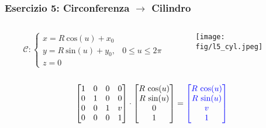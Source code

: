 \documentclass{beamer}
\newcommand{\fig}{./figures} %
\newcommand{\msin}{\mbox{sin}} %
\newcommand{\mcos}{\mbox{cos}} %
\begin{document}
\begin{frame}
\frametitle{Esercizio 5: Circonferenza $\rightarrow$ Cilindro}
\begin{columns}
\begin{column}{0.58\textwidth}
\begin{displaymath}
\mathcal{C}:
\begin{cases}
x = R~\mcos(u) + x_0\\
y = R~\msin(u) + y_0, & 0\le u\le 2\pi\\
z = 0
\end{cases}
\end{displaymath}
\end{column}
\begin{column}{0.39\textwidth}
\texttt{[image: \\fig/l5\_cyl.jpeg]}

\end{column}
\end{columns}
%
\vspace{0.1\textheight}
\begin{displaymath}
\begin{bmatrix}
1 & 0 & 0 & 0\\
0 & 1 & 0 & 0\\
0 & 0 & 1 & v\\
0 & 0 & 0 & 1
\end{bmatrix}
\cdot
\begin{bmatrix}
R~\mcos(u)\\
R~\msin(u)\\
0\\
1
\end{bmatrix}
= 
{\color{blue}
\begin{bmatrix}
R ~\mcos(u)\\
R ~\msin(u)\\
v\\
1
\end{bmatrix}
}
\end{displaymath}
\end{frame}
\end{document}
